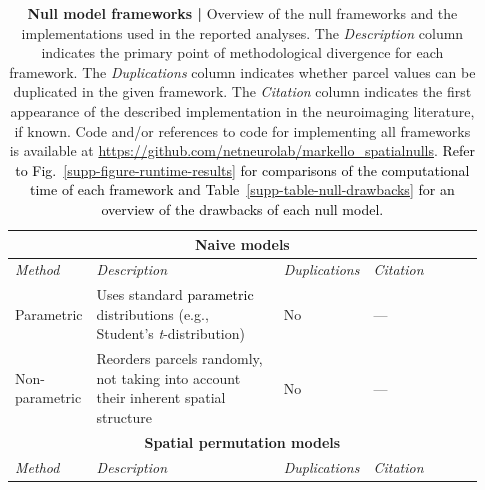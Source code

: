 \documentclass[12pt,aps,pra,reprint,showkeys]{revtex4-1}
\newcommand{\nimg}[1]{\textcolor{black}{{#1}}}
\begin{document}
\begin{table}[htp]
    \caption{
      \textbf{Null model frameworks | }
      Overview of the null frameworks and the implementations used in the reported analyses.
      The \emph{Description} column indicates the primary point of methodological divergence for each framework.
      The \emph{Duplications} column indicates whether parcel values can be duplicated in the given framework.
      The \emph{Citation} column indicates the first appearance of the described implementation in the neuroimaging literature, if known.
      Code and/or references to code for implementing all frameworks is available at \url{https://github.com/netneurolab/markello_spatialnulls}.
      \nimg{Refer to Fig.~\ref{supp-figure-runtime-results} for comparisons of the computational time of each framework and Table~\ref{supp-table-null-drawbacks} for an overview of the drawbacks of each null model.}
      \vspace{-0.5\baselineskip}
    }
    \label{table-null-models}
    \setlength{\tabcolsep}{4.5pt}
    \renewcommand{\arraystretch}{1.25}
    \begin{center}
      \begin{tabular}{p{0.15\linewidth} p{0.43\linewidth} p{0.10\linewidth} p{0.25\linewidth}}
                                                                                                                                                                         \toprule
        \multicolumn{4}{c}{\textbf{Naive models}}                                                                                                                     \\ \toprule
        \emph{Method}   & \emph{Description}                                                                                & \emph{Duplications} & \emph{Citation}   \\ \midrule
        Parametric      & Uses standard \nimg{parametric} distributions (e.g., Student's \emph{t}-distribution)             & No  &  ---                              \\
        Non-parametric  & Reorders parcels randomly, not taking into account their inherent spatial structure               & No  &  ---                              \\ \toprule
        \multicolumn{4}{c}{\textbf{Spatial permutation models}}                                                                                                       \\ \toprule
        \emph{Method}   & \emph{Description}                                                                                & \emph{Duplications} & \emph{Citation}   \\ \midrule

\end{tabular}
\end{center}
\end{table}
\end{document}
